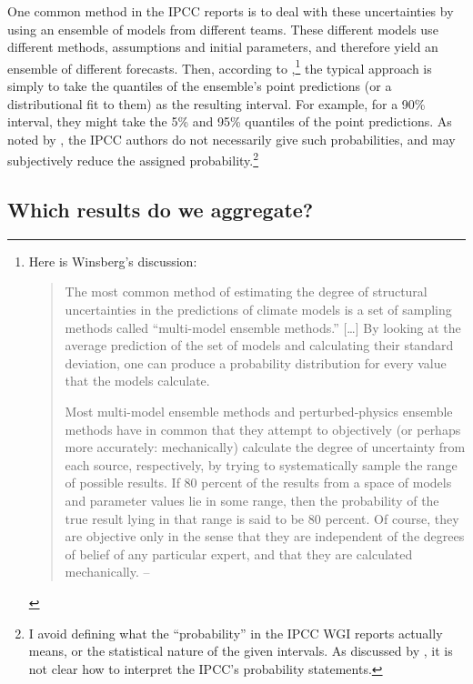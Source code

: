 \documentclass[12pt]{article}
\begin{document}
One common method in the IPCC reports is to deal with these uncertainties by using an ensemble of models from different teams. These different models use different methods, assumptions and initial parameters, and therefore yield an ensemble of different forecasts. Then, according to \citet[pg. 96]{winsberg2018philosophy},\footnote{Here is Winsberg's discussion: \begin{quote}
  The most common method of estimating the degree of structural uncertainties in the predictions of climate models is a set of sampling methods called ``multi-model ensemble methods.'' [\ldots] By looking at the average prediction of the set of models and calculating their standard deviation, one can produce a probability distribution for every value that the models calculate.
  
  Most multi-model ensemble methods and perturbed-physics ensemble methods have in common that they attempt to objectively (or perhaps more accurately: mechanically) calculate the degree of uncertainty from each source, respectively, by trying to systematically sample the range of possible results. If 80 percent of the results from a space of models and parameter values lie in some range, then the probability of the true result lying in that range is said to be 80 percent. Of course, they are objective only in the sense that they are independent of the degrees of belief of any particular expert, and that they are calculated mechanically.
  \hfill -- \citet[pg. 96]{winsberg2018philosophy}
\end{quote}} the typical approach is simply to take the quantiles of the ensemble's point predictions (or a distributional fit to them) as the resulting interval. For example, for a 90\% interval, they might take the 5\% and 95\% quantiles of the point predictions. As noted by \citet[Section 2.5.2, pg. 63]{harris2021conceptualizing}, the IPCC authors do not necessarily give such probabilities, and may subjectively reduce the assigned probability.\footnote{I avoid defining what the ``probability'' in the IPCC WGI reports actually means, or the statistical nature of the given intervals. As discussed by \citet[Section 1.4]{harris2021conceptualizing}, it is not clear how to interpret the IPCC's probability statements.}






\subsection{Which results do we aggregate?}
\end{document}
